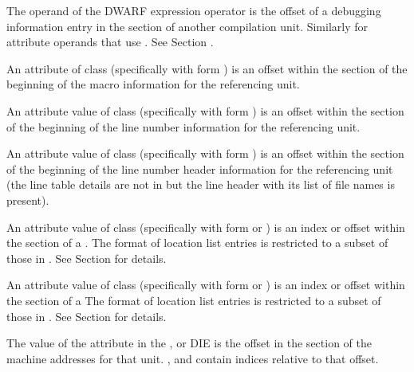 \begin{description}
The operand of the \DWOPcallref{} DWARF expression 
operator is the offset of a debugging 
information entry in the \dotdebuginfodwo{} section of 
another compilation unit.  Similarly for attribute 
operands that use \DWFORMrefaddr. 
See Section .

An attribute of class \CLASSmacptr{} (specifically \DWATmacros{} 
with form \DWFORMsecoffset{}) is an offset within the 
\dotdebugmacrodwo{} section of the beginning of the macro 
information for the referencing unit.

An attribute value of class \CLASSlineptr{} (specifically 
\DWATstmtlist{} with form \DWFORMsecoffset) 
is an offset within the \dotdebugline{} section of the 
beginning of the line number information for the 
referencing unit.

An attribute value of class \CLASSlineptr{} (specifically  
\DWATstmtlist{}  with form \DWFORMsecoffset) 
is an offset within the \dotdebuglinedwo{} section of the 
beginning of the line number header information 
for the referencing unit (the line table details are not in 
\dotdebuglinedwo{} but the line header with its list 
of file names is present).

An attribute value of class \CLASSrnglist{} (specifically 
\DWATranges{} with form \DWFORMrnglistx{} or \DWFORMsecoffset) 
is an index or offset within the \dotdebugrnglistsdwo{}
section of a .
The format of \dotdebugrnglistsdwo{} location list entries 
is restricted to a subset of those in \dotdebugrnglists.
See Section  for details.

An attribute value of class 
\CLASSloclist{} (specifically with form \DWFORMloclistx{}
or \DWFORMsecoffset) 
is an index or offset within the \dotdebugloclistsdwo{} 
section of a 
The format of \dotdebugloclistsdwo{} location list entries 
is restricted to a subset of those in \dotdebugloclists.
See Section  for details.

The value of the \DWATaddrbase{} attribute in the 
\DWTAGcompileunit, \DWTAGpartialunit{} or \DWTAGtypeunit{} DIE 
is the offset in the \dotdebugaddr{} section of the machine 
addresses for that unit.
\DWFORMaddrxXN, \DWOPaddrx{} and \DWOPconstx{} contain indices 
relative to that offset.


\end{description}
